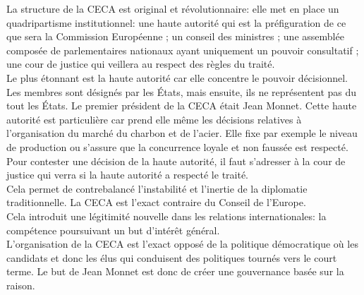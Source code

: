 \documentclass[12pt, a4paper, openany]{book}
\begin{document}
La structure de la CECA est original et révolutionnaire: elle met en place un quadripartisme institutionnel: une haute autorité qui est la préfiguration de ce que sera la Commission Européenne ; un conseil des ministres ; une assemblée composée de parlementaires nationaux ayant uniquement un pouvoir consultatif ; une cour de justice qui veillera au respect des règles du traité. \\
Le plus étonnant est la haute autorité car elle concentre le pouvoir décisionnel. Les membres sont désignés par les États, mais ensuite, ils ne représentent pas du tout les États. Le premier président de la CECA était Jean Monnet. Cette haute autorité est particulière car prend elle même les décisions relatives à l'organisation du marché du charbon et de l'acier. Elle fixe par exemple le niveau de production ou s'assure que la concurrence loyale et non faussée est respecté. Pour contester une décision de la haute autorité, il faut s'adresser à la cour de justice qui verra si la haute autorité a respecté le traité. \\
Cela permet de contrebalancé l'instabilité et l'inertie de la diplomatie traditionnelle. La CECA est l'exact contraire du Conseil de l'Europe. \\
Cela introduit une légitimité nouvelle dans les relations internationales: la compétence poursuivant un but d'intérêt général. \\
L'organisation de la CECA est l'exact opposé de la politique démocratique où les candidats et donc les élus qui conduisent des politiques tournés vers le court terme. Le but de Jean Monnet est donc de créer une gouvernance basée sur la raison. \\
\end{document}
